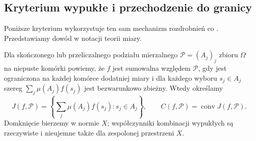 \subsection{Kryterium wypukłe i przechodzenie do granicy}

Poniższe kryterium wykorzystuje ten sam mechanizm
rozdrobnień co .
Przedstawiamy dowód w notacji teorii miary.

\begin{definicja}
\label{def:birkhoff-sum-set-30}
Dla skończonego lub przeliczalnego podziału mierzalnego
$\mathcal P=(A_j)_j$ zbioru $\Omega$ na niepuste komórki
powiemy, że $f$ jest sumowalna względem $\mathcal P$, gdy jest ograniczona na każdej
komórce dodatniej miary i dla każdego wyboru
$s_j\in A_j$ szereg $\sum_j\mu(A_j)f(s_j)$ jest
bezwarunkowo zbieżny. Wtedy określamy
\[
 J(f,\mathcal P)=
 \left\{\sum_j\mu(A_j)f(s_j):s_j\in A_j\right\},
 \qquad
 C(f,\mathcal P)=\overline{\operatorname{conv}}J(f,\mathcal P).
\]
Domknięcie bierzemy w normie $X$; współczynniki
kombinacji wypukłych są rzeczywiste i nieujemne
także dla zespolonej przestrzeni $X$.
\end{definicja}


